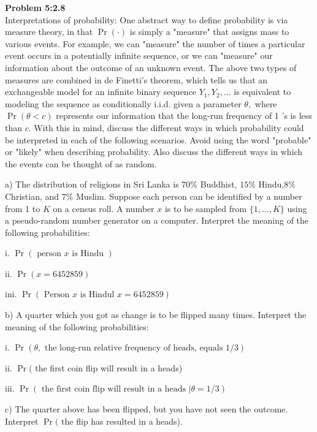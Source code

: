 \documentclass[a4paper, 11pt]{article}
\newenvironment{problem}[2][Problem]
    { \begin{mdframed}[backgroundcolor=gray!20] \textbf{#1 #2} \\}
    {  \end{mdframed}}
\begin{document}
\begin{problem}{5:2.8}
Interpretations of probability: One abstract way to define probability is via measure theory, in that $\operatorname{Pr}(\cdot)$ is simply a "measure" that assigns mass to various events. For example, we can "measure" the number of times a particular event occurs in a potentially infinite sequence, or we can "measure" our information about the outcome of an unknown event. The above two types of measures are combined in de Finetti's theorem, which tells us that an exchangeable model for an infinite binary sequence $Y_{1}, Y_{2}, \ldots$ is equivalent to modeling the sequence as conditionally i.i.d. given a parameter $\theta,$ where $\operatorname{Pr}(\theta<c)$ represents our information that the long-run frequency of 1 's is less than $c .$ With this in mind, discuss the different ways in which probability could be interpreted in each of the following scenarios. Avoid using the word "probable" or "likely" when describing probability. Also discuss the different ways in which the events can be thought of as random.

a) The distribution of religions in Sri Lanka is $70 \%$ Buddhist, $15 \%$ Hindu,$8 \%$ Christian, and $7 \%$ Muslim. Suppose each person can be identified by a number from 1 to $K$ on a census roll. A number $x$ is to be sampled from $\{1, \ldots, K\}$ using a pseudo-random number generator on a computer. Interpret the meaning of the following probabilities:

i. $\operatorname{Pr}(\text { person } x \text { is Hindu })$

ii. $\operatorname{Pr}(x=6452859)$

ini. $\operatorname{Pr}(\text { Person } x \text { is Hindul } x=6452859)$

b) A quarter which you got as change is to be flipped many times. Interpret the meaning of the following probabilities:

i. $\operatorname{Pr}(\theta, \text { the long-run relative frequency of heads, equals } 1 / 3)$

ii. $\operatorname{Pr}($ the first coin flip will result in a heads)

iii. $\operatorname{Pr}(\text { the first coin flip will result in a heads } | \theta=1 / 3)$

c) The quarter above has been flipped, but you have not seen the outcome. Interpret $\operatorname{Pr}($ the flip has resulted in a heads).
\end{problem}
\end{document}
